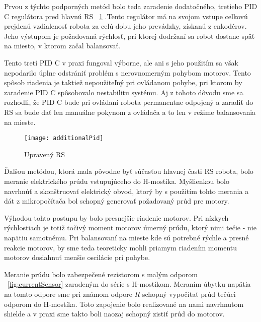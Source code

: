 Prvou z týchto podporných metód bolo teda zaradenie dodatočného, tretieho PID C regulátora pred hlavnú RS \figurename~\ref{fig:thridPID} .Tento regulátor má na svojom vstupe celkovú prejdenú vzdialenosť robota za celú dobu jeho prevádzky, získanú z enkodérov. Jeho výstupom je požadovaná rýchlosť, pri ktorej dodržaní sa robot dostane späť na miesto, v ktorom začal balansovať. 

Tento tretí PID C v praxi fungoval výborne, ale ani s jeho použitím sa však nepodarilo úplne odstrániť problém s nerovnomerným pohybom motorov. Tento spôsob riadenia je taktiež nepoužiteľný pri ovládanom pohybe, pri ktorom by zaradenie PID C spôsobovalo nestabilitu systému. Aj z tohoto dôvodu sme sa rozhodli, že PID C bude pri ovládaní robota permanentne odpojený a zaradiť do RS sa bude dať len manuálne pokynom z ovládača a to len v režime balansovania na mieste. 

\begin{figure}[h]
\centering
\texttt{[image: additionalPid]}
\caption{Upravený RS}
\label{fig:thridPID}
\end{figure}


Ďalšou metódou, ktorá mala pôvodne byť súčasťou hlavnej časti RS robota, bolo meranie elektrického prúdu vstupujúceho do H-mostíka. Myšlienkou bolo navrhnúť a skonštruovať elektrický obvod, ktorý by s použitím tohto merania a dát z mikropočítača bol schopný generovať požadovaný prúd pre motory. 

Výhodou tohto postupu by bolo presnejšie riadenie motorov. Pri nízkych rýchlostiach je totiž točivý moment motorov úmerný prúdu, ktorý nimi tečie - nie napätiu samotnému. Pri balansovaní na mieste kde sú potrebné rýchle a presné reakcie motorov, by sme teda teoreticky mohli priamym riadením momentu motorov dosiahnuť menšie oscilácie pri pohybe.

Meranie prúdu bolo zabezpečené rezistorom s malým odporom \figurename~\ref{fig:currentSensor} zaradeným do série s H-mostíkom. Meraním úbytku napätia na tomto odpore sme pri známom odpore $R$ schopný vypočítať prúd tečúci odporom do H-mostíka. Toto zapojenie bolo realizované na nami navrhnutom shielde a v praxi sme takto boli naozaj schopný zistiť prúd do motorov.



 
  

 
